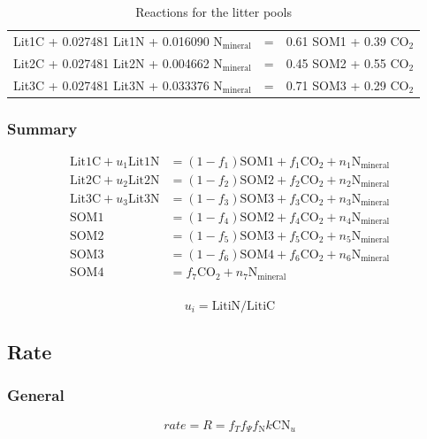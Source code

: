 \documentclass[12pt, a4paper]{article}
\begin{document}
\begin{table}[h]
\caption{Reactions for the litter pools}
\begin{center}
\begin{tabular}{lll}
Lit1C + 0.027481 Lit1N + 0.016090 $\text{N}_\text{mineral}$ & = & 0.61 SOM1 + 0.39 $\text{CO}_2$  \\
Lit2C + 0.027481 Lit2N + 0.004662 $\text{N}_\text{mineral}$ & = & 0.45 SOM2 + 0.55 $\text{CO}_2$  \\
Lit3C + 0.027481 Lit3N + 0.033376 $\text{N}_\text{mineral}$ & = & 0.71 SOM3 + 0.29 $\text{CO}_2$  \\
\end{tabular}
\end{center}
\label{LitterReactions}
\end{table}

\subsubsection{Summary}
\begin{align*}
\text{Lit1C} + u_1 \text {Lit1N} & = \left(1-f_1\right) \text{SOM1} + f_1 \text{CO}_2 + n_1 \text{N}_\text{mineral} \\
\text{Lit2C} + u_2 \text {Lit2N} & = \left(1-f_2\right) \text{SOM2} + f_2 \text{CO}_2 + n_2 \text{N}_\text{mineral} \\
\text{Lit3C} + u_3 \text {Lit3N} & = \left(1-f_3\right) \text{SOM3} + f_3 \text{CO}_2 + n_3 \text{N}_\text{mineral} \\
\text{SOM1} & = \left(1-f_4\right) \text{SOM2} + f_4 \text{CO}_2 + n_4 \text{N}_\text{mineral} \\
\text{SOM2} & = \left(1-f_5\right) \text{SOM3} + f_5 \text{CO}_2 + n_5 \text{N}_\text{mineral} \\
\text{SOM3} & = \left(1-f_6\right) \text{SOM4} + f_6 \text{CO}_2 + n_6 \text{N}_\text{mineral} \\
\text{SOM4} & = f_7 \text{CO}_2 + n_7 \text{N}_\text{mineral} \\
\end{align*}

\begin{equation*}
u_i = \text{LitiN}/\text{LitiC}
\end{equation*}

\subsection{Rate}
\subsubsection{General}
\begin{equation}
\label{clmcn_rate}
rate = R = f_T f_\Psi f_\text{N} k \text{CN}_u
\end{equation}
\end{document}

